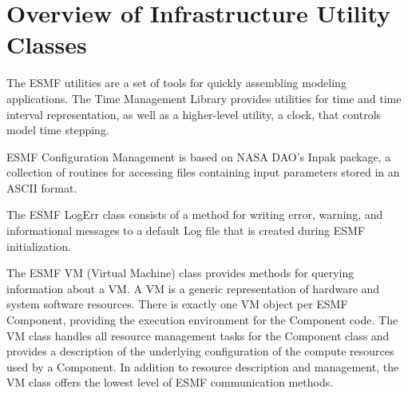 
\section{Overview of Infrastructure Utility Classes}

The ESMF utilities are a set of tools for quickly assembling modeling applications.  The Time Management Library provides utilities for time and time interval representation, as well as a higher-level utility, a clock, that controls model time stepping.

ESMF Configuration Management is based on NASA DAO's Inpak package, a collection of routines for accessing files containing input parameters stored in an ASCII format.

The ESMF LogErr class consists of a method for writing error, warning, and informational messages to a default Log file that is created during ESMF initialization.

The ESMF VM (Virtual Machine) class provides methods for querying information about a VM. A VM is a generic representation of hardware and system software resources. There is exactly one VM object per ESMF Component, providing the execution environment for the Component code. The VM class handles all resource management tasks for the Component class and provides a description of the underlying configuration of the compute resources used by a Component.  In addition to resource description and management, the VM class offers the lowest level of ESMF communication methods.
